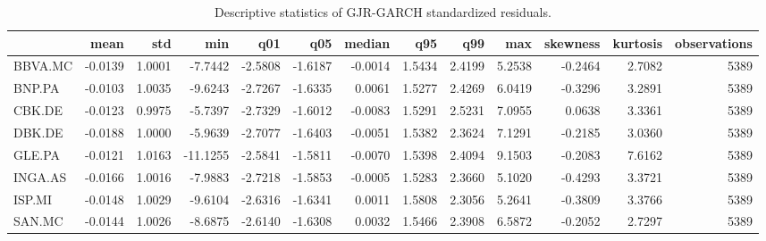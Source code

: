 \begin{table}
\caption{Descriptive statistics of GJR-GARCH standardized residuals.}
\label{tab:standardized_residuals_descriptive_stats}
\begin{tabular}{lrrrrrrrrrrrr}
\toprule
 & mean & std & min & q01 & q05 & median & q95 & q99 & max & skewness & kurtosis & observations \\
\midrule
BBVA.MC & -0.0139 & 1.0001 & -7.7442 & -2.5808 & -1.6187 & -0.0014 & 1.5434 & 2.4199 & 5.2538 & -0.2464 & 2.7082 & 5389 \\
BNP.PA & -0.0103 & 1.0035 & -9.6243 & -2.7267 & -1.6335 & 0.0061 & 1.5277 & 2.4269 & 6.0419 & -0.3296 & 3.2891 & 5389 \\
CBK.DE & -0.0123 & 0.9975 & -5.7397 & -2.7329 & -1.6012 & -0.0083 & 1.5291 & 2.5231 & 7.0955 & 0.0638 & 3.3361 & 5389 \\
DBK.DE & -0.0188 & 1.0000 & -5.9639 & -2.7077 & -1.6403 & -0.0051 & 1.5382 & 2.3624 & 7.1291 & -0.2185 & 3.0360 & 5389 \\
GLE.PA & -0.0121 & 1.0163 & -11.1255 & -2.5841 & -1.5811 & -0.0070 & 1.5398 & 2.4094 & 9.1503 & -0.2083 & 7.6162 & 5389 \\
INGA.AS & -0.0166 & 1.0016 & -7.9883 & -2.7218 & -1.5853 & -0.0005 & 1.5283 & 2.3660 & 5.1020 & -0.4293 & 3.3721 & 5389 \\
ISP.MI & -0.0148 & 1.0029 & -9.6104 & -2.6316 & -1.6341 & 0.0011 & 1.5808 & 2.3056 & 5.2641 & -0.3809 & 3.3766 & 5389 \\
SAN.MC & -0.0144 & 1.0026 & -8.6875 & -2.6140 & -1.6308 & 0.0032 & 1.5466 & 2.3908 & 6.5872 & -0.2052 & 2.7297 & 5389 \\
\bottomrule
\end{tabular}
\end{table}
